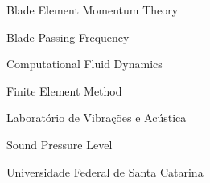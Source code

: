 \begin{siglas}
    \item[BEMT] Blade Element Momentum Theory
    \item[BPF] Blade Passing Frequency
    \item[CFD] Computational Fluid Dynamics
    \item[FEM] Finite Element Method
    \item[LVA] Laboratório de Vibrações e Acústica
    \item[SPL] Sound Pressure Level
    \item[UFSC] Universidade Federal de Santa Catarina
\end{siglas}
